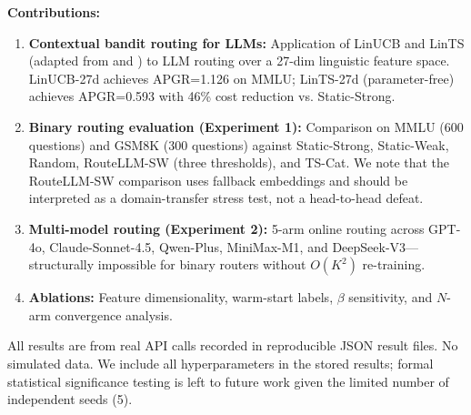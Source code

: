 \textbf{Contributions:}
\begin{enumerate}
    \item \textbf{Contextual bandit routing for LLMs:} Application of LinUCB and LinTS (adapted from \citet{li2010contextual} and \citet{abeille2017linear}) to LLM routing over a 27-dim linguistic feature space. LinUCB-27d achieves APGR=1.126 on MMLU; LinTS-27d (parameter-free) achieves APGR=0.593 with 46\% cost reduction vs. Static-Strong.
    \item \textbf{Binary routing evaluation (Experiment 1):} Comparison on MMLU (600 questions) and GSM8K (300 questions) against Static-Strong, Static-Weak, Random, RouteLLM-SW (three thresholds), and TS-Cat. We note that the RouteLLM-SW comparison uses fallback embeddings and should be interpreted as a domain-transfer stress test, not a head-to-head defeat.
    \item \textbf{Multi-model routing (Experiment 2):} 5-arm online routing across GPT-4o, Claude-Sonnet-4.5, Qwen-Plus, MiniMax-M1, and DeepSeek-V3\mbox{---}structurally impossible for binary routers without $O(K^2)$ re-training.
    \item \textbf{Ablations:} Feature dimensionality, warm-start labels, $\beta$ sensitivity, and $N$-arm convergence analysis.
\end{enumerate}

All results are from real API calls recorded in reproducible JSON result files. No simulated data. We include all hyperparameters in the stored results; formal statistical significance testing is left to future work given the limited number of independent seeds (5).

